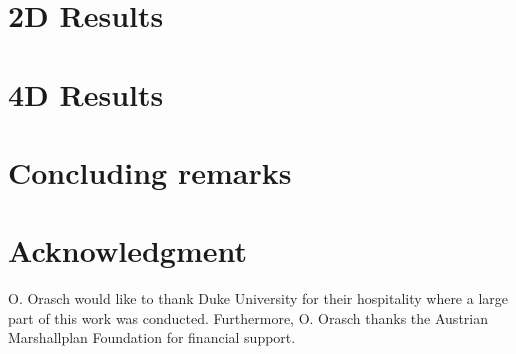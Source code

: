 \documentclass{PoS}
\begin{document}
\section{2D Results}

\section{4D Results}

\newpage


\section{Concluding remarks}

\section{Acknowledgment}
O. Orasch would like to thank Duke University for their hospitality where a large part of this work was conducted. Furthermore, O. Orasch thanks the Austrian Marshallplan Foundation for financial support.
 
\end{document}
